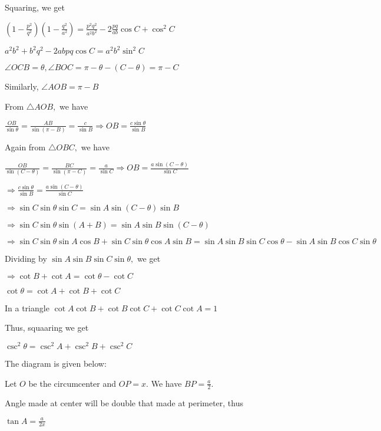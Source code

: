   Squaring, we get

  $\left(1 - \frac{p^2}{q^2}\right)\left(1 - \frac{q^2}{a^2}\right) = \frac{p^2q^2}{a^2b^2} - 2\frac{pq}{ab}\cos C +
  \cos^2C$

  $a^2b^2 + b^2q^2 - 2abpq\cos C = a^2b^2\sin^2C$

\item $\angle OCB = \theta, \angle BOC = \pi - \theta - (C - \theta) = \pi - C$

  Similarly, $\angle AOB = \pi - B$

  From $\triangle AOB,$ we have

  $\frac{OB}{\sin\theta} = \frac{AB}{\sin(\pi - B)} = \frac{c}{\sin B} \Rightarrow OB = \frac{c\sin\theta}{\sin B}$

  Again from $\triangle OBC,$ we have

  $\frac{OB}{\sin(C - \theta)} = \frac{BC}{\sin(\pi - C)} = \frac{a}{\sin C} \Rightarrow OB = \frac{a\sin(C -
    \theta)}{\sin C}$

  $\Rightarrow \frac{c\sin\theta}{\sin B} = \frac{a\sin(C - \theta)}{\sin C}$

  $\Rightarrow \sin C\sin\theta\sin C = \sin A\sin(C - \theta)\sin B$

  $\Rightarrow \sin C\sin\theta\sin(A + B) = \sin A\sin B\sin(C - \theta)$

  $\Rightarrow \sin C\sin\theta\sin A\cos B + \sin C\sin\theta\cos A\sin B = \sin A\sin B\sin C\cos\theta - \sin A\sin
  B\cos C\sin\theta$

  Dividing by $\sin A\sin B\sin C\sin\theta,$ we get

  $\Rightarrow \cot B + \cot A = \cot \theta - \cot C$

  $\cot\theta = \cot A + \cot B + \cot C$

  In a triangle $\cot A\cot B + \cot B\cot C + \cot C\cot A = 1$

  Thus, squaaring we get

  $\csc^2\theta = \csc^2A + \csc^2B + \csc^2C$

\item The diagram is given below:

  \startplacefigure
    \externalfigure[20_6.pdf]
  \stopplacefigure

  Let $O$ be the circumcenter and $OP = x.$ We have $BP= \frac{a}{2}.$

  Angle made at center will be double that made at perimeter, thus

  $\tan A = \frac{a}{2x}$

